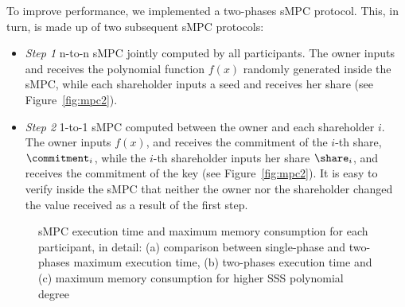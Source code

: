 To improve performance, we implemented a two-phases sMPC protocol. 
This, in turn, is made up of two subsequent sMPC protocols:
\begin{itemize}
	\item {\em Step 1} n-to-n sMPC jointly computed by all participants. The owner inputs \key and receives the polynomial function $f\left( x \right)$ randomly generated inside the sMPC, while each shareholder inputs a seed and receives her share (see Figure~\ref{fig:mpc2}). 
	\item {\em Step 2} 1-to-1 sMPC computed between the owner and each shareholder $i$. The owner inputs $f\left( x \right)$, and receives the commitment of the $i$-th share, $\commitment_i$, while the $i$-th shareholder inputs her share $\share_{i}$, and receives the commitment of the key (see Figure~\ref{fig:mpc2}). It is easy to verify inside the sMPC that neither the owner nor the shareholder changed the value received as a result of the first step.
\end{itemize}


\begin{figure}[t]
	\centering
	\hfill
	\hfill
	\caption{sMPC execution time and maximum memory consumption for each participant, in detail: (a) comparison between single-phase and two-phases maximum execution time, (b) two-phases execution time and (c) maximum memory consumption for higher SSS polynomial degree}
	\label{fig:timecomp}
\end{figure}


